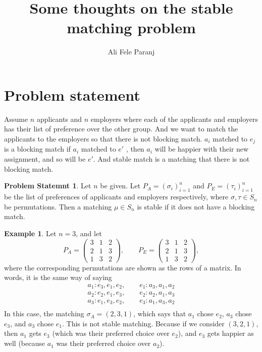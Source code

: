 \documentclass[11pt,a4paper]{article}
\title{Some thoughts on the stable matching problem}
\author{Ali Fele Paranj}
\theoremstyle{definition}
\newtheorem{prob}{Problem Statemnt}
\newtheorem{example}{Example}
\theoremstyle{remark}
\begin{document}
	\maketitle
	
	\section{Problem statement}
	Assume $ n $ applicants and $ n $ employers where each of the applicants and employers has their list of preference over the other group. And we want to match the applicants to the employers so that there is not blocking match. $ a_i $ matched to $ e_j $ is a blocking match if $ a_i $ matched to $ e' $ , then $ a_i $ will be happier with their new assignment, and so will be $ e' $. And stable match is a matching that there is not blocking match.
	
	\begin{prob}
		Let $ n $ be given. Let $ P_A = (\sigma_i)_{i=1}^n $ and $ P_E = (\tau_i)_{i=1}^n $ be the list of preferences of applicants and employers respectively, where $ \sigma,\tau \in S_n $ be permutations. Then a matching $ \mu \in S_n $ is stable if it does not have a blocking match. 
	\end{prob}
	
	\begin{example}
		Let $ n=3 $, and let 
		\[ P_A = \begin{pmatrix}
			3 & 1 & 2 \\
			2 & 1 & 3 \\ 
			1 & 3 & 2
		\end{pmatrix}, \qquad
		P_E = \begin{pmatrix}
			3 & 1 & 2 \\
			2 & 1 & 3 \\
			1 & 3 & 2
		\end{pmatrix},
		 \]
		where the corresponding permutations are shown as the rows of a matrix. In words, it is the same way of saying
		\begin{align*}
			a_1: e_3,e_1,e_2, \qquad e_1:a_3,a_1,a_2 \\
			a_2: e_2,e_1,e_3, \qquad e_2:a_2,a_1,a_3 \\
			a_3: e_1,e_3,e_2, \qquad e_3:a_1,a_3,a_2 \\
		\end{align*}
		In this case, the matching $ \sigma_A = (2,3,1)$, which says that $ a_1 $ chose $ e_2 $, $ a_3 $ chose $ e_3 $, and $ a_3 $ chose $ e_1 $. This is not stable matching. Because if we consider $ (3,2,1) $, then $ a_1 $ gets $ e_3 $ (which was their preferred choice over $ e_2 $), and $ e_3 $ gets happier as well (because $ a_1 $ was their preferred choice over $ a_2 $). 
	\end{example}
	
\end{document}
